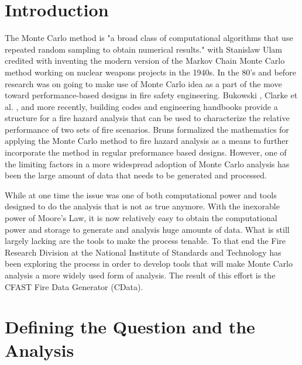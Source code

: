 \documentclass[12pt,twoside]{book}
\begin{document}
\cleardoublepage
\tableofcontents

\clearpage
\listoffigures

\listoftables


\mainmatter

%
%

\chapter{Introduction}

The Monte Carlo method is "a broad class of computational algorithms that use repeated random sampling to obtain numerical results." with Stanislaw Ulam credited with inventing the modern version of the Markov Chain Monte Carlo method working on nuclear weapons projects in the 1940s. In the 80’s and before research was on going to make use of Monte Carlo idea as a part of the move toward performance-based designs in fire safety engineering. Bukowski \cite{Bukowski_1985}, Clarke et al. \cite{Clarke_1990}, and more recently, building codes \cite{NFPA_5000} and engineering handbooks \cite{Hurley_2016} provide a structure for a fire hazard analysis that can be used to characterize the relative performance of two sets of fire scenarios. Bruns \cite{bruns_tn_2016} formalized the mathematics for applying the Monte Carlo method to fire hazard analysis as a means to further incorporate the method in regular preformance based designs. However, one of the limiting factors in a more widespread adoption of Monte Carlo analysis has been the large amount of data that needs to be generated and processed.

While at one time the issue was one of both computational power and tools designed to do the analysis that is not as true anymore. With the inexorable power of Moore’s Law, it is now relatively easy to obtain the computational power and storage to generate and analysis huge amounts of data. What is still largely lacking are the tools to make the process tenable. To that end the Fire Research Division at the National Institute of Standards and Technology has been exploring the process \cite{NIST_TN_2041,Reneke_2017,Reneke_2018,Cleary_2019} in order to develop tools that will make Monte Carlo analysis a more widely used form of analysis. The result of this effort is the CFAST Fire Data Generator (CData).

%
%

\chapter{Defining the Question and the Analysis}
\end{document}
